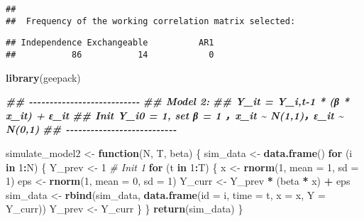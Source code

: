 \documentclass[
]{article}
\newenvironment{Shaded}{\begin{snugshade}}{\end{snugshade}}
\newcommand{\AttributeTok}[1]{\textcolor[rgb]{0.13,0.29,0.53}{#1}}
\newcommand{\CommentTok}[1]{\textcolor[rgb]{0.56,0.35,0.01}{\textit{#1}}}
\newcommand{\ControlFlowTok}[1]{\textcolor[rgb]{0.13,0.29,0.53}{\textbf{#1}}}
\newcommand{\DecValTok}[1]{\textcolor[rgb]{0.00,0.00,0.81}{#1}}
\newcommand{\DocumentationTok}[1]{\textcolor[rgb]{0.56,0.35,0.01}{\textbf{\textit{#1}}}}
\newcommand{\FunctionTok}[1]{\textcolor[rgb]{0.13,0.29,0.53}{\textbf{#1}}}
\newcommand{\NormalTok}[1]{#1}
\newcommand{\OtherTok}[1]{\textcolor[rgb]{0.56,0.35,0.01}{#1}}
\newcommand{\SpecialCharTok}[1]{\textcolor[rgb]{0.81,0.36,0.00}{\textbf{#1}}}
\begin{document}
\begin{verbatim}
## 
##  Frequency of the working correlation matrix selected:
\end{verbatim}

\begin{Shaded}
\end{Shaded}

\begin{verbatim}
## Independence Exchangeable          AR1 
##           86           14            0
\end{verbatim}

\begin{Shaded}
\begin{Highlighting}[]
\FunctionTok{library}\NormalTok{(geepack)}

\DocumentationTok{\#\# {-}{-}{-}{-}{-}{-}{-}{-}{-}{-}{-}{-}{-}{-}{-}{-}{-}{-}{-}{-}{-}{-}{-}{-}{-}{-}{-}}
\DocumentationTok{\#\# Model 2:}
\DocumentationTok{\#\# Y\_it = Y\_i,t{-}1 * (β * x\_it) + ε\_it}
\DocumentationTok{\#\# Init Y\_i0 = 1, set β = 1 ，x\_it \textasciitilde{} N(1,1)，ε\_it \textasciitilde{} N(0,1)}
\DocumentationTok{\#\# {-}{-}{-}{-}{-}{-}{-}{-}{-}{-}{-}{-}{-}{-}{-}{-}{-}{-}{-}{-}{-}{-}{-}{-}{-}{-}{-}}

\NormalTok{simulate\_model2 }\OtherTok{\textless{}{-}} \ControlFlowTok{function}\NormalTok{(N, T, beta) \{}
\NormalTok{  sim\_data }\OtherTok{\textless{}{-}} \FunctionTok{data.frame}\NormalTok{()}
  \ControlFlowTok{for}\NormalTok{ (i }\ControlFlowTok{in} \DecValTok{1}\SpecialCharTok{:}\NormalTok{N) \{}
\NormalTok{    Y\_prev }\OtherTok{\textless{}{-}} \DecValTok{1}  \CommentTok{\# Init 1}
    \ControlFlowTok{for}\NormalTok{ (t }\ControlFlowTok{in} \DecValTok{1}\SpecialCharTok{:}\NormalTok{T) \{}
\NormalTok{      x }\OtherTok{\textless{}{-}} \FunctionTok{rnorm}\NormalTok{(}\DecValTok{1}\NormalTok{, }\AttributeTok{mean =} \DecValTok{1}\NormalTok{, }\AttributeTok{sd =} \DecValTok{1}\NormalTok{)}
\NormalTok{      eps }\OtherTok{\textless{}{-}} \FunctionTok{rnorm}\NormalTok{(}\DecValTok{1}\NormalTok{, }\AttributeTok{mean =} \DecValTok{0}\NormalTok{, }\AttributeTok{sd =} \DecValTok{1}\NormalTok{)}
\NormalTok{      Y\_curr }\OtherTok{\textless{}{-}}\NormalTok{ Y\_prev }\SpecialCharTok{*}\NormalTok{ (beta }\SpecialCharTok{*}\NormalTok{ x) }\SpecialCharTok{+}\NormalTok{ eps}
\NormalTok{      sim\_data }\OtherTok{\textless{}{-}} \FunctionTok{rbind}\NormalTok{(sim\_data, }\FunctionTok{data.frame}\NormalTok{(}\AttributeTok{id =}\NormalTok{ i, }\AttributeTok{time =}\NormalTok{ t, }\AttributeTok{x =}\NormalTok{ x, }\AttributeTok{Y =}\NormalTok{ Y\_curr))}
\NormalTok{      Y\_prev }\OtherTok{\textless{}{-}}\NormalTok{ Y\_curr}
\NormalTok{    \}}
\NormalTok{  \}}
  \FunctionTok{return}\NormalTok{(sim\_data)}
\NormalTok{\}}



\end{Highlighting}
\end{Shaded}
\end{document}

